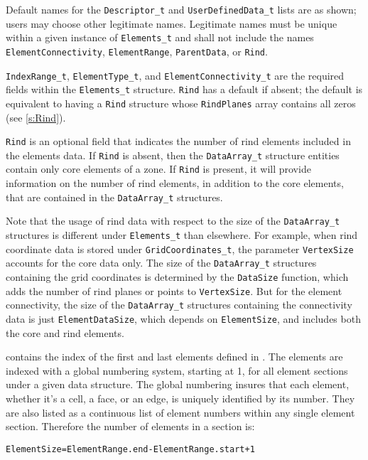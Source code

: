 \begin{notes}
\item Default names for the \texttt{Descriptor\_t} and
      \texttt{UserDefinedData\_t} lists are as shown; users may choose
      other legitimate names.
      Legitimate names must be unique within a given instance
      of \texttt{Elements\_t} and shall not include the names
      \texttt{ElementConnectivity}, \texttt{ElementRange},
      \texttt{ParentData}, or \texttt{Rind}.
\item \texttt{IndexRange\_t}, \texttt{ElementType\_t}, and
      \texttt{ElementConnectivity\_t} are the required fields within the
      \texttt{Elements\_t} structure.
      \texttt{Rind} has a default if absent; the default is equivalent
      to having a \texttt{Rind} structure whose \texttt{RindPlanes}
      array contains all zeros (see \autoref{s:Rind}).
\end{notes}

\texttt{Rind} is an optional field that indicates the number of rind
elements included in the elements data.
If \texttt{Rind} is absent, then the \texttt{DataArray\_t} structure
entities contain only core elements of a zone.
If \texttt{Rind} is present, it will provide information on the number
of rind elements, in addition to the core elements, that are contained
in the \texttt{DataArray\_t} structures.

Note that the usage of rind data with respect to the size of the
\texttt{DataArray\_t} structures is different under \texttt{Elements\_t}
than elsewhere.
For example, when rind coordinate data is stored under
\texttt{GridCoordinates\_t}, the parameter \texttt{VertexSize} accounts
for the core data only.
The size of the \texttt{DataArray\_t} structures containing the grid
coordinates is determined by the \texttt{DataSize} function, which adds
the number of rind planes or points to \texttt{VertexSize}.
But for the element connectivity, the size of the \texttt{DataArray\_t}
structures containing the connectivity data is just
\texttt{ElementDataSize}, which depends on \texttt{ElementSize}, and
includes both the core and rind elements.

 contains the index of the first and last elements defined
in .
The elements are indexed with a global numbering system, starting at 1,
for all element sections under a given  data structure.
The global numbering insures that each element, whether it's a cell,
a face, or an edge, is uniquely identified by its number.
They are also listed as a continuous list of element numbers within
any single element section.
Therefore the number of elements in a section is:
\begin{alltt}
  ElementSize = ElementRange.end - ElementRange.start + 1
\end{alltt}

